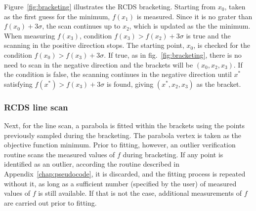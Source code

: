 Figure~\ref{fig:bracketing} illustrates the \gls*{RCDS} bracketing. Starting from $x_0$, taken as the first guess for the minimum, $f(x_1)$ is measured. Since it is no grater than $f(x_0)+3\sigma$, the scan continues up to $x_2$, which is updated as the the minimum. When measuring $f(x_3)$, condition $f(x_3) > f(x_2) + 3\sigma$ is true and the scanning in the positive direction stops. The starting point, $x_0$, is checked for the condition $f(x_0)>f(x_3)+3\sigma$. If true, as in fig.~\ref{fig:bracketing}, there is no need to scan in the negative direction and the brackets will be $(x_0, x_2, x_3)$. If the condition is false, the scanning continues in the negative direction until $x^*$ satisfying $f(x^*)>f(x_3)+3\sigma$ is found, giving $(x^*, x_2, x_3)$ as the bracket.

\subsubsection{RCDS line scan}
Next, for the line scan, a parabola is fitted within the brackets using the points previously sampled during the bracketing. The parabola vertex is taken as the objective function minimum. Prior to fitting, however, an outlier verification routine scans the measured values of $f$ during bracketing. If any point is identified as an outlier, according the routine described in Appendix~\ref{chap:pseudocode}, it is discarded, and the fitting process is repeated without it, as long as a sufficient number (specified by the user) of measured values of $f$ is still available. If that is not the case, additional measurements of $f$ are carried out prior to fitting.

